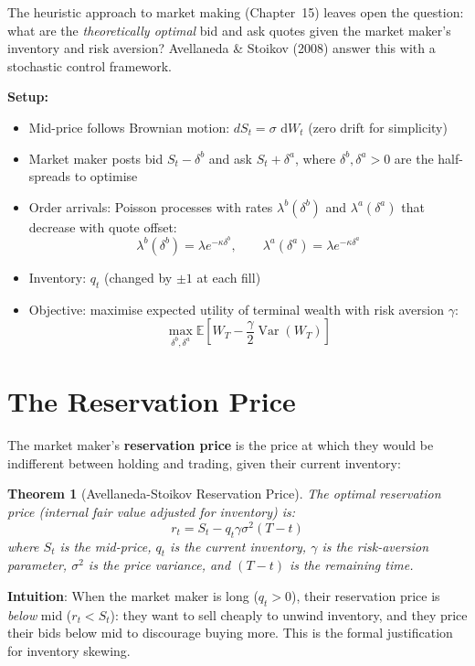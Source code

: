 \documentclass[12pt,a4paper,openany]{report}
\newtheorem{theorem}{Theorem}[chapter]
\theoremstyle{definition}
\newcommand{\E}{\mathbb{E}}
\newcommand{\Var}{\operatorname{Var}}
\newcommand{\dd}{\,\mathrm{d}}
\begin{document}
The heuristic approach to market making (Chapter~15) leaves open the question: what are the \emph{theoretically optimal} bid and ask quotes given the market maker's inventory and risk aversion? Avellaneda \& Stoikov (2008) answer this with a stochastic control framework.

\textbf{Setup:}
\begin{itemize}
  \item Mid-price follows Brownian motion: $dS_t = \sigma\,\dd W_t$ (zero drift for simplicity)
  \item Market maker posts bid $S_t - \delta^b$ and ask $S_t + \delta^a$, where $\delta^b, \delta^a > 0$ are the half-spreads to optimise
  \item Order arrivals: Poisson processes with rates $\lambda^b(\delta^b)$ and $\lambda^a(\delta^a)$ that decrease with quote offset:
  \[
    \lambda^b(\delta^b) = \lambda e^{-\kappa\delta^b}, \qquad \lambda^a(\delta^a) = \lambda e^{-\kappa\delta^a}
  \]
  \item Inventory: $q_t$ (changed by $\pm 1$ at each fill)
  \item Objective: maximise expected utility of terminal wealth with risk aversion $\gamma$:
  \[
    \max_{\delta^b, \delta^a} \E\!\left[W_T - \frac{\gamma}{2}\Var(W_T)\right]
  \]
\end{itemize}

\section{The Reservation Price}

The market maker's \textbf{reservation price} is the price at which they would be indifferent between holding and trading, given their current inventory:

\begin{theorem}[Avellaneda-Stoikov Reservation Price]
The optimal reservation price (internal fair value adjusted for inventory) is:
\[
  r_t = S_t - q_t \gamma \sigma^2 (T - t)
\]
where $S_t$ is the mid-price, $q_t$ is the current inventory, $\gamma$ is the risk-aversion parameter, $\sigma^2$ is the price variance, and $(T-t)$ is the remaining time.
\end{theorem}

\textbf{Intuition}: When the market maker is long ($q_t > 0$), their reservation price is \emph{below} mid ($r_t < S_t$): they want to sell cheaply to unwind inventory, and they price their bids below mid to discourage buying more. This is the formal justification for inventory skewing.
\end{document}
